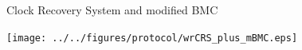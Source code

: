 \documentclass[compress,red]{beamer}
\begin{document}
% 
% 
% 
% 
% 
% 
\begin{frame}{Clock Recovery System and modified BMC}


  \begin{center}
  \texttt{[image: ../../figures/protocol/wrCRS\_plus\_mBMC.eps]}
  \end{center}

\end{frame}
\end{document}
